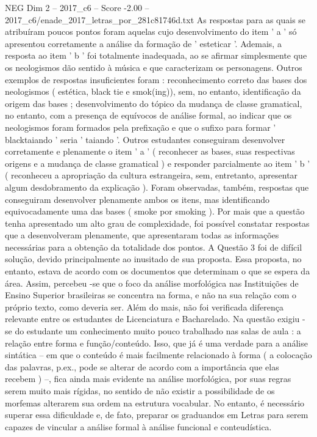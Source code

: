\begin{textsample}{NEG Dim 2 – 2017\_c6 – Score -2.00 – 2017\_c6/enade\_2017\_letras\_por\_281c81746d.txt}
As respostas para as quais se atribuíram poucos pontos foram aquelas cujo desenvolvimento do item ' a ' só apresentou corretamente a análise da formação de ' esteticar '.
Ademais, a resposta ao item ' b ' foi totalmente inadequada, ao se afirmar simplesmente que os neologismos dão sentido à música e que caracterizam os personagens.
Outros exemplos de respostas insuficientes foram : reconhecimento correto das bases dos neologismos ( estética, black tie e smok(ing)), sem, no entanto, identificação da origem das bases ; desenvolvimento do tópico da mudança de classe gramatical, no entanto, com a presença de equívocos de análise formal, ao indicar que os neologismos foram formados pela prefixação e que o sufixo para formar ' blacktaiando ' seria ' taiando '.
Outros estudantes conseguiram desenvolver corretamente e plenamente o item ' a ' ( reconhecer as bases, suas respectivas origens e a mudança de classe gramatical ) e responder parcialmente ao item ' b ' ( reconheceu a apropriação da cultura estrangeira, sem, entretanto, apresentar algum desdobramento da explicação ).
Foram observadas, também, respostas que conseguiram desenvolver plenamente ambos os itens, mas identificando equivocadamente uma das bases ( smoke por smoking ).
Por mais que a questão tenha apresentado um alto grau de complexidade, foi possível constatar respostas que a desenvolveram plenamente, que apresentaram todas as informações necessárias para a obtenção da totalidade dos pontos.
A Questão 3 foi de difícil solução, devido principalmente ao inusitado de sua proposta.
Essa proposta, no entanto, estava de acordo com os documentos que determinam o que se espera da área.
Assim, percebeu -se que o foco da análise morfológica nas Instituições de Ensino Superior brasileiras se concentra na forma, e não na sua relação com o próprio texto, como deveria ser.
Além do mais, não foi verificada diferença relevante entre os estudantes de Licenciatura e Bacharelado.
Na questão exigiu -se do estudante um conhecimento muito pouco trabalhado nas salas de aula : a relação entre forma e função/conteúdo.
Isso, que já é uma verdade para a análise sintática – em que o conteúdo é mais facilmente relacionado à forma ( a colocação das palavras, p.ex., pode se alterar de acordo com a importância que elas recebem ) –, fica ainda mais evidente na análise morfológica, por suas regras serem muito mais rígidas, no sentido de não existir a possibilidade de os morfemas alterarem sua ordem na estrutura vocabular.
No entanto, é necessário superar essa dificuldade e, de fato, preparar os graduandos em Letras para serem capazes de vincular a análise formal à análise funcional e conteudística.

\end{textsample}
